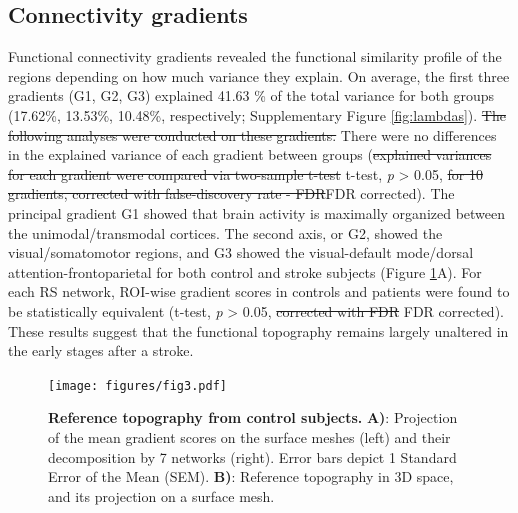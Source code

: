 \documentclass[fleqn,10pt]{wlscirep}
\begin{document}
\subsection*{Connectivity gradients}
Functional connectivity gradients revealed the functional similarity profile of the regions depending on how much variance they explain. On average, the first three gradients (G1, G2, G3) explained  41.63 \% of the total variance for both groups (17.62\%, 13.53\%, 10.48\%, respectively; Supplementary Figure \ref{fig:lambdas}). \color{red}\st{The following analyses were conducted on these gradients.}\color{black} There were no differences in the explained variance of each gradient between groups (\color{red}\st{explained variances for each gradient were compared via two-sample t-test}\color{blue} t-test\color{black}, \emph{p} > 0.05, \color{red}\st{for 10 gradients, corrected with false-discovery rate - FDR}\color{blue}FDR corrected\color{black}).  The principal gradient G1 showed that brain activity is maximally organized between the unimodal/transmodal cortices. The second axis, or G2, showed the visual/somatomotor regions, and G3 showed the visual-default mode/dorsal attention-frontoparietal for both control and stroke subjects (Figure \ref{fig:summary}A). For each RS network, ROI-wise gradient scores in controls and patients were found to be statistically equivalent (t-test, \emph{p}  > 0.05, \color{red}\st{corrected with FDR}\color{blue} FDR corrected\color{black}). These results suggest that the functional topography remains largely unaltered in the early stages after a stroke.%

\begin{figure}[]
\centering
\texttt{[image: figures/fig3.pdf]}
\caption{\label{fig:summary} \textbf{Reference topography from control subjects.} \textbf{A)}: Projection of the mean gradient scores on the surface meshes
(left) and their decomposition by 7 networks (right). Error bars depict 1 Standard Error of the Mean (SEM). \textbf{B)}: Reference
topography in 3D space, and its projection on a surface mesh.}
\end{figure}
\end{document}
